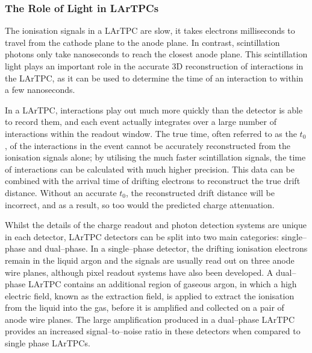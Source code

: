 \subsubsection*{The Role of Light in LArTPCs}

The ionisation signals in a LArTPC are slow, it takes electrons milliseconds to
travel from the cathode plane to the anode plane. In contrast, scintillation 
photons only take nanoseconds to reach the closest anode plane. This 
scintillation light plays an important role in the accurate 3D reconstruction 
of interactions in the LArTPC, as it can be used to determine the time of an 
interaction to within a few nanoseconds.

In a LArTPC, interactions play out much more quickly than the detector is able 
to record them, and each event actually integrates over a large number of 
interactions within the readout window. The true time, often referred to as 
the $t_0$, of the interactions in the event cannot be accurately reconstructed 
from the ionisation signals alone; by utilising the much faster scintillation 
signals, the time of interactions can be calculated with much higher 
precision. This data can be combined with the arrival time of drifting 
electrons to reconstruct the true drift distance. Without an accurate $t_0$, 
the reconstructed drift distance will be incorrect, and as a result, so too
would the predicted charge attenuation.

Whilst the details of the charge readout and photon detection systems are unique
in each detector, LArTPC detectors can be split into two main categories: 
single--phase and dual--phase. In a single--phase detector, the drifting 
ionisation electrons remain in the liquid argon and the signals are usually 
read out on three anode wire planes, although pixel readout systems have also 
been developed\cite{argoncube}. A dual--phase LArTPC contains an additional 
region of gaseous argon, in which a high electric field, known as the 
extraction field, is applied to extract the ionisation from the liquid into 
the gas, before it is amplified and collected on a pair of anode wire 
planes\cite{Abi:2020wmh}. The large amplification produced in a dual--phase
LArTPC provides an increased signal--to--noise ratio in these detectors when
compared to single phase LArTPCs.

